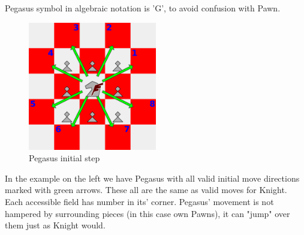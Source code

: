 \documentclass[a5paper,12pt,draft]{book} %
\begin{document}
Pegasus symbol in algebraic notation is 'G', to avoid confusion with Pawn.

\vspace{1\baselineskip}

\noindent
\begin{figure}
\includegraphics[width=0.5\textwidth, keepaspectratio=true]{../gfx/examples/01_move_pegasus_initial.png}
\caption{Pegasus initial step}
\label{fig:pegasus_initial_step}
\end{figure}
\indent
In the example on the left we have Pegasus with all valid initial move directions
marked with green arrows. These all are the same as valid moves for Knight. Each
accessible field has number in its' corner. Pegasus' movement is not hampered by
surrounding pieces (in this case own Pawns), it can "jump" over them just as Knight
would.

\clearpage
\end{document}
